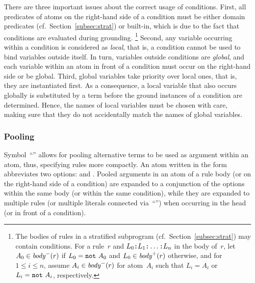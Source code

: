 There are three important issues about the correct usage of conditions.
First, all predicates of atoms on the right-hand side of a condition
must be either domain predicates (cf.\ Section~\ref{subsec:strat}) or built-in,
which is due to the fact that conditions are evaluated during grounding.%
\footnote{%
  The bodies of rules in a stratified subprogram (cf.\ Section~\ref{subsec:strat})
  may contain conditions.
  For a rule~$r$ and
  $L_0\texttt{:}L_1\texttt{:}\dots\texttt{:}L_n$
  in the body of~$r$,
  let $A_0\in\mathit{body}^-(r)$ if $L_0=\texttt{not}~A_0$
  and $L_0\in\mathit{body}^+(r)$ otherwise,
  and for $1\leq i\leq n$, 
  assume $A_i\in\mathit{body}^-(r)$ for atom~$A_i$
  such that $L_i=A_i$ or $L_i=\texttt{not}~A_i$, respectively.
  }
Second, any variable occurring within a condition is considered as \emph{local},
that is, a condition cannot be used to bind variables outside itself.
In turn, variables outside conditions are \emph{global}, and each variable
within an atom in front of a condition must occur on the right-hand side or
be global.
Third, global variables take priority over local ones, that is,
they are instantiated first.
As a consequence, a local variable that also occurs globally is substituted by a term
before the ground instances of a condition are determined.
Hence, the names of local variables must be chosen with care,
making sure that they do not accidentally match the names of global variables.


\subsubsection{Pooling}\label{subsec:gringo:pool}

Symbol~``\code{;}'' allows for pooling alternative terms to be used as
argument within an atom, thus, specifying rules more compactly.
An atom written in the form 
abbreviates two options:
 and .
Pooled arguments in an atom of a rule body 
(or on the right-hand side of a condition) are expanded to a conjunction
of the options within the same body (or within the same condition),
while they are expanded to multiple rules 
(or multiple literals connected via~``\code{,}'')
when occurring in the head (or in front of a condition).

